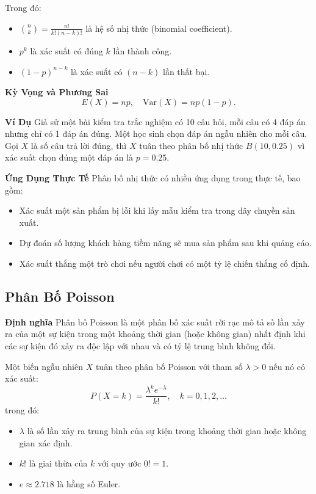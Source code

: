 Trong đó:
\begin{itemize}
    \item $\binom{n}{k} = \frac{n!}{k!(n-k)!}$ là hệ số nhị thức (binomial coefficient).
    \item $p^k$ là xác suất có đúng $k$ lần thành công.
    \item $(1-p)^{n-k}$ là xác suất có $(n-k)$ lần thất bại.
\end{itemize}

\textbf{Kỳ Vọng và Phương Sai}
\begin{equation}
    E(X) = np, \quad \text{Var}(X) = np(1-p).
\end{equation}

\textbf{Ví Dụ}
Giả sử một bài kiểm tra trắc nghiệm có 10 câu hỏi, mỗi câu có 4 đáp án nhưng chỉ có 1 đáp án đúng. Một học sinh chọn đáp án ngẫu nhiên cho mỗi câu. Gọi $X$ là số câu trả lời đúng, thì $X$ tuân theo phân bố nhị thức $B(10, 0.25)$ vì xác suất chọn đúng một đáp án là $p = 0.25$.

\textbf{Ứng Dụng Thực Tế}
Phân bố nhị thức có nhiều ứng dụng trong thực tế, bao gồm:
\begin{itemize}
    \item Xác suất một sản phẩm bị lỗi khi lấy mẫu kiểm tra trong dây chuyền sản xuất.
    \item Dự đoán số lượng khách hàng tiềm năng sẽ mua sản phẩm sau khi quảng cáo.
    \item Xác suất thắng một trò chơi nếu người chơi có một tỷ lệ chiến thắng cố định.
\end{itemize}



\subsection{Phân Bố Poisson}
\textbf{Định nghĩa}
Phân bố Poisson là một phân bố xác suất rời rạc mô tả số lần xảy ra của một sự kiện trong một khoảng thời gian (hoặc không gian) nhất định khi các sự kiện đó xảy ra độc lập với nhau và có tỷ lệ trung bình không đổi.

Một biến ngẫu nhiên $X$ tuân theo phân bố Poisson với tham số $\lambda > 0$ nếu nó có xác suất:
\begin{equation}
P(X = k) = \frac{\lambda^k e^{-\lambda}}{k!}, \quad k = 0,1,2,\dots
\end{equation}
trong đó:
\begin{itemize}
    \item $\lambda$ là số lần xảy ra trung bình của sự kiện trong khoảng thời gian hoặc không gian xác định.
    \item $k!$ là giai thừa của $k$ với quy ước $0! = 1$.
    \item $e \approx 2.718$ là hằng số Euler.
\end{itemize}

